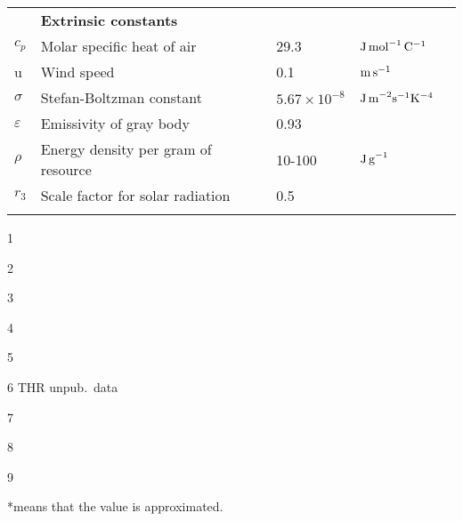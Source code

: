 \begin{table}
\begin{threeparttable}[b]
\begin{tabular}{l l l l l}
& \textbf{Extrinsic constants} & & &  \\
$c_p$ & Molar specific heat of air  & 29.3 &  $\rm{J \, mol}^ {-1} \, \rm{C}^ {-1}$ & \tnote{9} \\
u &  Wind speed & 0.1 & $\rm{m \, s}^{-1}$ & \\
$\sigma$ & Stefan-Boltzman constant & $5.67 \times 10^{-8}$ &  $\rm{J \, m}^{-2} \rm{s}^{-1} \rm{K}^{-4}  $  &  \\
$\varepsilon$& Emissivity of gray body & 0.93& & \tnote{9} \\
$\rho$ & Energy density per gram of resource & 10-100 &  $\rm{J \, g}^{-1}$  &  \\  %
$r_3$  & Scale factor for solar radiation & 0.5 &  &  \\
\bottomrule
\label{table:table1}
\end{tabular}
\begin{tablenotes}
  \item[1] \citet{Heinrich1975}
  \item[2] \citet{Kleiber1947,Peters1986,Gillooly2001}
  \item[3] \citet{Bartholomew1981,Niitepold2010}
  \item[4] \citet{Pawar2012, Nervo2014, Maino2015}
  \item[5] \citet{Bartholomew1977a}
  \item[6] THR unpub.\ data
  \item[7] \citet{Bartholomew1977b}
  \item[8] \citet{Kammer1974}
  \item[9] \citet{Campbell2012}
\end{tablenotes}
\end{threeparttable}
\raggedright{*means that the value is approximated.}
\end{table}
